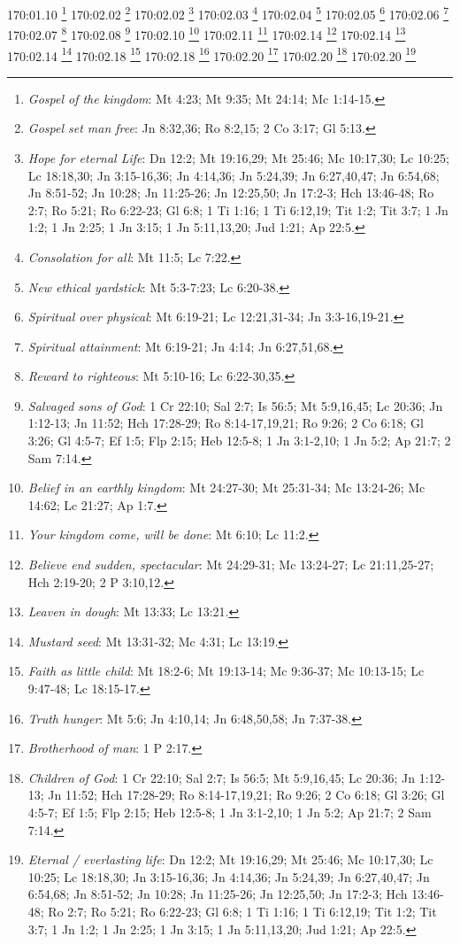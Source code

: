 {{{{{{{{{{{{{{{{{{{{{{{{{{{{{{{{{{{{{{{{{{{{{{{{{{170:01.10 \footnote{\textit{Gospel of the kingdom}: Mt 4:23; Mt 9:35; Mt 24:14; Mc 1:14-15.}
170:02.02 \footnote{\textit{Gospel set man free}: Jn 8:32,36; Ro 8:2,15; 2 Co 3:17; Gl 5:13.}
170:02.02 \footnote{\textit{Hope for eternal Life}: Dn 12:2; Mt 19:16,29; Mt 25:46; Mc 10:17,30; Lc 10:25; Lc 18:18,30; Jn 3:15-16,36; Jn 4:14,36; Jn 5:24,39; Jn 6:27,40,47; Jn 6:54,68; Jn 8:51-52; Jn 10:28; Jn 11:25-26; Jn 12:25,50; Jn 17:2-3; Hch 13:46-48; Ro 2:7; Ro 5:21; Ro 6:22-23; Gl 6:8; 1 Ti 1:16; 1 Ti 6:12,19; Tit 1:2; Tit 3:7; 1 Jn 1:2; 1 Jn 2:25; 1 Jn 3:15; 1 Jn 5:11,13,20; Jud 1:21; Ap 22:5.}
170:02.03 \footnote{\textit{Consolation for all}: Mt 11:5; Lc 7:22.}
170:02.04 \footnote{\textit{New ethical yardstick}: Mt 5:3-7:23; Lc 6:20-38.}
170:02.05 \footnote{\textit{Spiritual over physical}: Mt 6:19-21; Lc 12:21,31-34; Jn 3:3-16,19-21.}
170:02.06 \footnote{\textit{Spiritual attainment}: Mt 6:19-21; Jn 4:14; Jn 6:27,51,68.}
170:02.07 \footnote{\textit{Reward to righteous}: Mt 5:10-16; Lc 6:22-30,35.}
170:02.08 \footnote{\textit{Salvaged sons of God}: 1 Cr 22:10; Sal 2:7; Is 56:5; Mt 5:9,16,45; Lc 20:36; Jn 1:12-13; Jn 11:52; Hch 17:28-29; Ro 8:14-17,19,21; Ro 9:26; 2 Co 6:18; Gl 3:26; Gl 4:5-7; Ef 1:5; Flp 2:15; Heb 12:5-8; 1 Jn 3:1-2,10; 1 Jn 5:2; Ap 21:7; 2 Sam 7:14.}
170:02.10 \footnote{\textit{Belief in an earthly kingdom}: Mt 24:27-30; Mt 25:31-34; Mc 13:24-26; Mc 14:62; Lc 21:27; Ap 1:7.}
170:02.11 \footnote{\textit{Your kingdom come, will be done}: Mt 6:10; Lc 11:2.}
170:02.14 \footnote{\textit{Believe end sudden, spectacular}: Mt 24:29-31; Mc 13:24-27; Lc 21:11,25-27; Hch 2:19-20; 2 P 3:10,12.}
170:02.14 \footnote{\textit{Leaven in dough}: Mt 13:33; Lc 13:21.}
170:02.14 \footnote{\textit{Mustard seed}: Mt 13:31-32; Mc 4:31; Lc 13:19.}
170:02.18 \footnote{\textit{Faith as little child}: Mt 18:2-6; Mt 19:13-14; Mc 9:36-37; Mc 10:13-15; Lc 9:47-48; Lc 18:15-17.}
170:02.18 \footnote{\textit{Truth hunger}: Mt 5:6; Jn 4:10,14; Jn 6:48,50,58; Jn 7:37-38.}
170:02.20 \footnote{\textit{Brotherhood of man}: 1 P 2:17.}
170:02.20 \footnote{\textit{Children of God}: 1 Cr 22:10; Sal 2:7; Is 56:5; Mt 5:9,16,45; Lc 20:36; Jn 1:12-13; Jn 11:52; Hch 17:28-29; Ro 8:14-17,19,21; Ro 9:26; 2 Co 6:18; Gl 3:26; Gl 4:5-7; Ef 1:5; Flp 2:15; Heb 12:5-8; 1 Jn 3:1-2,10; 1 Jn 5:2; Ap 21:7; 2 Sam 7:14.}
170:02.20 \footnote{\textit{Eternal / everlasting life}: Dn 12:2; Mt 19:16,29; Mt 25:46; Mc 10:17,30; Lc 10:25; Lc 18:18,30; Jn 3:15-16,36; Jn 4:14,36; Jn 5:24,39; Jn 6:27,40,47; Jn 6:54,68; Jn 8:51-52; Jn 10:28; Jn 11:25-26; Jn 12:25,50; Jn 17:2-3; Hch 13:46-48; Ro 2:7; Ro 5:21; Ro 6:22-23; Gl 6:8; 1 Ti 1:16; 1 Ti 6:12,19; Tit 1:2; Tit 3:7; 1 Jn 1:2; 1 Jn 2:25; 1 Jn 3:15; 1 Jn 5:11,13,20; Jud 1:21; Ap 22:5.}
}}}}}}}}}}}}}}}}}}}}}}}}}}}}}}}}}}}}}}}}}}}}}}}}}}
